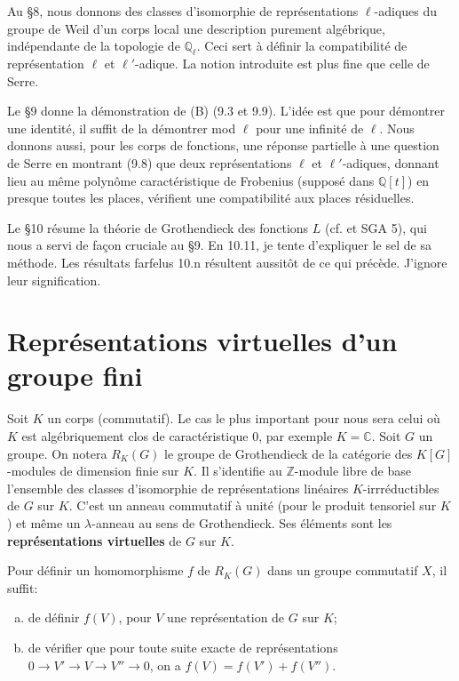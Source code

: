 \documentclass[11pt,a4paper]{amsart}
\theoremstyle{plain}
\theoremstyle{definition}
\newcommand{\dbZ}{\mathbb{Z}}
\newcommand{\dbQ}{\mathbb{Q}}
\newcommand{\dbC}{\mathbb{C}}
\newenvironment{para}{\par\noindent}{\par}
\begin{document}
Au \S8, nous donnons des classes d'isomorphie de repr\'esentations $\ell$-adiques du groupe de Weil d'un corps local une description purement alg\'ebrique, ind\'ependante de la topologie de $\dbQ_{\ell}$. Ceci sert \`a d\'efinir la compatibilit\'e de repr\'esentation $\ell$ et $\ell'$-adique. La notion introduite est plus fine que celle de Serre.

Le \S9 donne la d\'emonstration de (B) (9.3 et 9.9). L'id\'ee est que pour d\'emontrer une identit\'e, il suffit de la d\'emontrer mod $\ell$ pour une infinit\'e de $\ell$. Nous donnons aussi, pour les corps de fonctions, une r\'eponse partielle \`a une question de Serre en montrant (9.8) que deux repr\'esentations $\ell$ et $\ell'$-adiques, donnant lieu au m\^eme polyn\^ome caract\'eristique de Frobenius (suppos\'e dans $\dbQ[t]$) en presque toutes les places, v\'erifient une compatibilit\'e aux places r\'esiduelles.

Le \S10 r\'esume la th\'eorie de Grothendieck des fonctions $L$ (cf. \cite{7} et SGA 5), qui nous a servi de fa\c{c}on cruciale au \S9. En 10.11, je tente d'expliquer le sel de sa m\'ethode. Les r\'esultats farfelus 10.n r\'esultent aussit\^ot de ce qui pr\'ec\`ede. J'ignore leur signification.


\section{Repr\'esentations virtuelles d'un groupe fini}

\begin{para}
Soit $K$ un corps (commutatif). Le cas le plus important pour nous sera celui o\`u $K$ est alg\'ebriquement clos de caract\'eristique $0$, par exemple $K = \dbC$. Soit $G$ un groupe. On notera $R_{K}(G)$ le groupe de Grothendieck de la cat\'egorie des $K[G]$-modules de dimension finie sur $K$. Il s'identifie au $\dbZ$-module libre de base l'ensemble des classes d'isomorphie de repr\'esentations lin\'eaires $K$-irrr\'eductibles de $G$ sur $K$. C'est un anneau commutatif \`a unit\'e (pour le produit tensoriel sur $K$) et m\^eme un $\lambda$-anneau au sens de Grothendieck. Ses \'el\'ements sont les \textbf{repr\'esentations virtuelles} de $G$ sur $K$.
\end{para}

\begin{para}
Pour d\'efinir un homomorphisme $f$ de $R_{K}(G)$ dans un groupe commutatif $X$, il suffit:
\begin{enumerate}[(a)]
\item de d\'efinir $f(V)$, pour $V$ une repr\'esentation de $G$ sur $K$;
\item de v\'erifier que pour toute suite exacte de repr\'esentations $0 \to V' \to V \to V'' \to 0$, on a $f(V) = f(V') + f(V'')$.
\end{enumerate}
\end{para}
\end{document}
